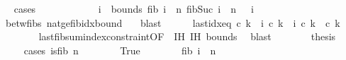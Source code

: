 \begin{isabellebody}
\ \ \isamarkupfalse%
{\isacharparenleft}{\kern0pt}cases{\isacharparenright}{\kern0pt}\isanewline
\ \ \ \ \isamarkupfalse%
\ {}\isanewline
\ \ \ \ \isamarkupfalse%
\ i\ \ bounds{\isacharcolon}{\kern0pt}\ {\isachardoublequoteopen}fib\ i\ {\isasymle}\ n{\isachardoublequoteclose}\ {\isachardoublequoteopen}fib{\isacharparenleft}{\kern0pt}Suc\ i{\isacharparenright}{\kern0pt}\ {\isachargreater}{\kern0pt}\ n{\isachardoublequoteclose}\ {\isachardoublequoteopen}{}\ {\isasymle}\ i{\isachardoublequoteclose}\ \isanewline
\ \ \ \ \ \ \isamarkupfalse%
\ betw{\isacharunderscore}{\kern0pt}fibs\ nat{\isacharunderscore}{\kern0pt}ge{\isacharunderscore}{\kern0pt}{}{\isacharunderscore}{\kern0pt}fib{\isacharunderscore}{\kern0pt}idx{\isacharunderscore}{\kern0pt}bound\ {}\ \isamarkupfalse%
\ blast\isanewline
\ \ \ \ \isamarkupfalse%
\ last{\isacharunderscore}{\kern0pt}idx{\isacharunderscore}{\kern0pt}eq{\isacharcolon}{\kern0pt}\ {\isachardoublequoteopen}c{\isacharprime}{\kern0pt}\ k{\isacharprime}{\kern0pt}\ {\isacharequal}{\kern0pt}\ i{\isachardoublequoteclose}\ {\isachardoublequoteopen}c\ k\ {\isacharequal}{\kern0pt}\ i{\isachardoublequoteclose}\ {\isachardoublequoteopen}c{\isacharprime}{\kern0pt}\ k{\isacharprime}{\kern0pt}\ {\isacharequal}{\kern0pt}\ c\ k{\isachardoublequoteclose}\isanewline
\ \ \ \ \ \ \isamarkupfalse%
\ last{\isacharunderscore}{\kern0pt}fib{\isacharunderscore}{\kern0pt}sum{\isacharunderscore}{\kern0pt}index{\isacharunderscore}{\kern0pt}constraint{\isacharbrackleft}{\kern0pt}OF\ {}{\isacharbrackright}{\kern0pt}\ IH{\isacharparenleft}{\kern0pt}{}{\isacharminus}{\kern0pt}{}{\isacharparenright}{\kern0pt}\ IH{\isacharparenleft}{\kern0pt}{}{\isacharminus}{\kern0pt}{}{\isacharparenright}{\kern0pt}\ bounds\ \isamarkupfalse%
\ blast{\isacharplus}{\kern0pt}\isanewline
\ \ \ \ \isamarkupfalse%
\ \isamarkupfalse%
\ {\isacharquery}{\kern0pt}thesis\isanewline
\ \ \ \ \isamarkupfalse%
{\isacharparenleft}{\kern0pt}cases\ {\isachardoublequoteopen}is{\isacharunderscore}{\kern0pt}fib\ n{\isachardoublequoteclose}{\isacharparenright}{\kern0pt}\isanewline
\ \ \ \ \ \ \isamarkupfalse%
\ True\isanewline
\ \ \ \ \ \ \isamarkupfalse%
\ {\isachardoublequoteopen}fib\ i\ {\isacharequal}{\kern0pt}\ n{\isachardoublequoteclose}\ \isanewline
\ \ \ \ \ \ \ \ \isamarkupfalse%

\end{isabellebody}
